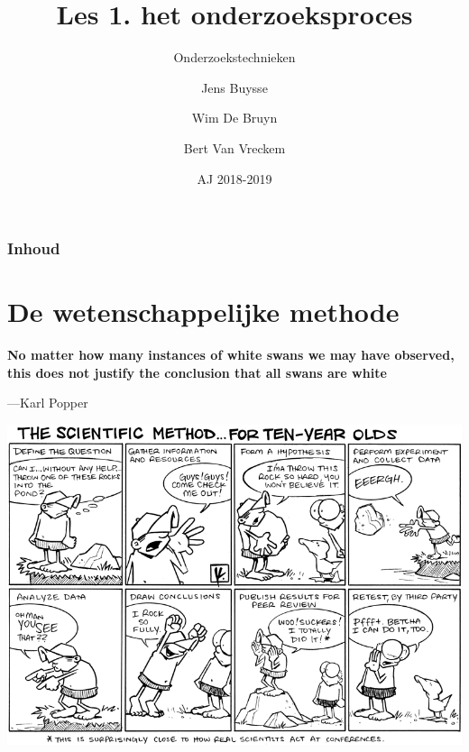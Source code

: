 \documentclass[aspectratio=169]{beamer}
\title[OZT: onderzoeksproces]{Les 1. het onderzoeksproces}
\subtitle{Onderzoekstechnieken}
\author{Jens Buysse \and Wim {De Bruyn} \and Bert {Van Vreckem}}
\date{AJ 2018-2019}
\begin{document}

\begin{frame}
  \maketitle
\end{frame}


\begin{frame}
  \frametitle{Inhoud}

  \tableofcontents
\end{frame}

\section{De wetenschappelijke methode}

\begin{frame}[plain]
  \bfseries\Large
  No matter how many instances of white swans we may have observed, this does not justify the conclusion that all swans are white
  
  \bigskip
  
  ---Karl Popper
\end{frame}

\begin{frame}[plain]
  \centering
  \includegraphics[height=\textheight]{img/les1-01}
\end{frame}
\end{document}
